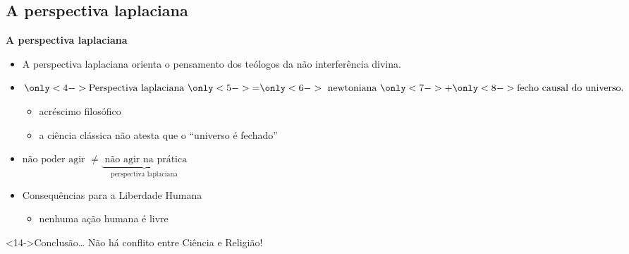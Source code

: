 \subsection{A perspectiva laplaciana}
\begin{frame}{\textbf{A perspectiva laplaciana}}
 \begin{itemize}
  \item<2->[$\bullet$] A perspectiva laplaciana orienta o pensamento dos 
   teólogos da não interferência divina.
  \item<3->[$\bullet$] $\only<4->{\text{Perspectiva laplaciana }} 
   \only<5->{=}
   \only<6->{\text{ newtoniana }} 
   \only<7->{+}
   \only<8->{\text{fecho causal do universo.}} $
    \begin{itemize}
     \item<9-> \textcolor{NordRed}{acréscimo filosófico}
     \item<10-> a ciência clássica não atesta que o ``universo é fechado''
    \end{itemize}
  \item<11->[$\bullet$] $\text{não poder agir } \neq \underbrace{\text{ não agir na prática}}_{\text{perspectiva laplaciana}} $
  \item<12->[$\bullet$] Consequências para a Liberdade Humana
    \begin{itemize}
     \item<13-> nenhuma ação humana é livre
    \end{itemize}
 \end{itemize}
 \centering
 \begin{minipage}{\textwidth}
   \begin{exampleblock}<14->{Conclusão\ldots}
     Não há conflito entre Ciência e Religião!
   \end{exampleblock}
 \end{minipage}
\end{frame}

